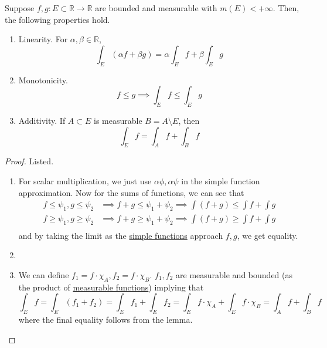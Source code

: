   \begin{theorem}
    \label{thm:axiomatic-properties-for-bounded-measurable}
    Suppose $f, g: E \subset \mathbb{R} \to \mathbb{R}$ are bounded and measurable with $m(E) < +\infty$. Then, the following properties hold. 
    \begin{enumerate}
      \item Linearity. For $\alpha, \beta \in \mathbb{R}$, 
        \begin{equation}
          \int_E (\alpha f + \beta g) = \alpha \int_E f + \beta \int_E g
        \end{equation} 

      \item Monotonicity. 
        \begin{equation}
          f \leq g \implies \int_E f \leq \int_E g
        \end{equation}

      \item Additivity. If $A \subset E$ is measurable $B = A \setminus E$, then 
        \begin{equation}
          \int_E f  = \int_A f + \int_B f
        \end{equation}
    \end{enumerate}
  \end{theorem}
  \begin{proof} 
    Listed. 
    \begin{enumerate}
      \item For scalar multiplication, we just use $\alpha \phi, \alpha \psi$ in the simple function approximation. Now for the sums of functions, we can see that 
        \begin{align}
          f \leq \psi_1, g \leq \psi_2 & \implies f + g \leq \psi_1 + \psi_2 \implies \int (f + g) \leq \int f + \int g \\ 
          f \geq \psi_1, g \geq \psi_2 & \implies f + g \geq \psi_1 + \psi_2 \implies \int (f + g) \geq \int f + \int g \\ 
        \end{align} 
        and by taking the limit as the \hyperref[def:simple-functions]{simple functions} approach $f, g$, we get equality. 
      \item 
      \item We can define $f_1 = f \cdot \chi_A, f_2 = f \cdot \chi_B$. $f_1, f_2$ are measurable and bounded (as the product of \hyperref[def:measurable-function]{measurable functions}) implying that 
        \begin{equation}
          \int_E f = \int_E (f_1 + f_2) = \int_E f_1 + \int_E f_2 = \int_E f \cdot \chi_A + \int_E f \cdot \chi_B = \int_A f + \int_B f
        \end{equation}
        where the final equality follows from the lemma. 
    \end{enumerate}
  \end{proof} 

